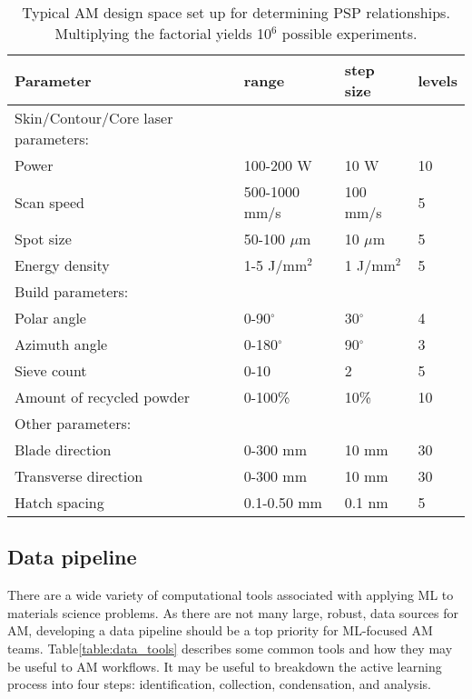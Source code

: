 \begin{table*}
    \renewcommand{\arraystretch}{0.8}
    \setlength{\tabcolsep}{5pt}
    \begin{center}
        \begin{tabular}{@{}llll@{}}
            \toprule
            \hline
             Parameter & range & step size & levels \\ \midrule
            \hline
            \hline
            Skin/Contour/Core laser parameters: & & & \\
            Power & 100-200 W & 10 W & 10 \\
            Scan speed & 500-1000 mm/s & 100 mm/s & 5 \\
            Spot size & 50-100 $\mu$m & 10 $\mu$m & 5 \\
            Energy density & 1-5 J/mm$^2$ & 1 J/mm$^2$ & 5 \\
            \hline
            Build parameters: & & & \\
            Polar angle & 0-90$^\circ$ & 30$^\circ$  & 4 \\
            Azimuth angle & 0-180$^\circ$ & 90$^\circ$  & 3 \\
            Sieve count & 0-10 & 2 & 5 \\
            Amount of recycled powder & 0-100\% & 10\% & 10 \\
            \hline
            Other parameters: & & & \\
            Blade direction & 0-300 mm & 10 mm  & 30 \\
            Transverse direction & 0-300 mm & 10 mm  & 30 \\
            Hatch spacing & 0.1-0.50 mm & 0.1 nm  & 5 \\
            \hline
            \bottomrule
        \end{tabular}
        \caption{Typical AM design space set up for determining PSP relationships. Multiplying the factorial yields 10$^6$ possible experiments.}
        \label{table:design_space}
    \end{center}
\end{table*}

\subsection{Data pipeline}
\label{subsec:DMC_data}
There are a wide variety of computational tools associated with applying ML to materials science problems.
As there are not many large, robust, data sources for AM, developing a data pipeline should be a top priority for ML-focused AM teams.
Table\ref{table:data_tools} describes some common tools and how they may be useful to AM workflows.
It may be useful to breakdown the active learning process into four steps: identification, collection, condensation, and analysis.

